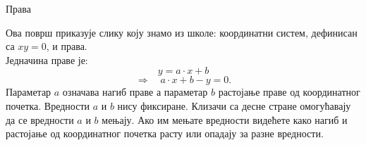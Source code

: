 ﻿\documentclass[en]{./../../common/SurferDesc}%
\begin{document}
\footnotesize
%
 
\begin{surferPage}
  \begin{surferTitle}Права\end{surferTitle}
   \begin{surferText}
   
Ова површ приказује слику коју знамо из школе: координатни систем, дефинисан са $xy=0$, и права. \\Једначина праве је:
\[y=a\cdot x + b\]
\[ \Rightarrow \quad a\cdot x +b -y=0.\]
Параметар  $a$ означава нагиб праве а параметар  $b$ растојање праве од координатног почетка.
\newline \newline
Вредности  $a$ и $b$ нису фиксиране. Клизачи са десне стране омогућавају да се вредности $a$ и $b$ мењају. Ако им мењате вредности видећете како нагиб и растојање од координатног почетка расту или опадају за разне вредности.

     \end{surferText}
\end{surferPage}
\end{document}
